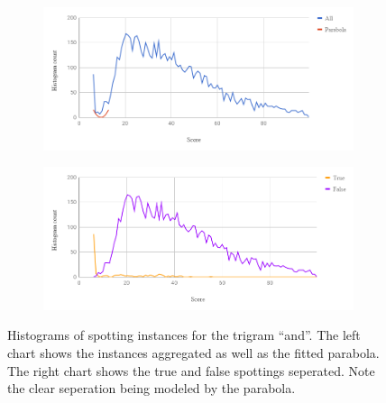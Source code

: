 \documentclass[ms,electronic,twosidetoc,letterpaper,chaptercenter,parttop,lof,lot]{byumsphd}
\begin{document}


\begin{figure}
\centering
    \begin{subfigure}{.89\textwidth}
  		\centering
  		\includegraphics[width=.99\linewidth]{two_dist_ex_All}
	\end{subfigure}
	\begin{subfigure}{.89\textwidth}
  		\centering
  		\includegraphics[width=.99\linewidth]{two_dist_ex_TF}
	\end{subfigure}
    \caption{Histograms of spotting instances for the trigram ``and''. The left chart shows the instances aggregated as well as the fitted parabola. The right chart shows the true and false spottings seperated. Note the clear seperation being modeled by the parabola.
    }
    \label{fig:two_dist_ex}
\end{figure}
\end{document}

